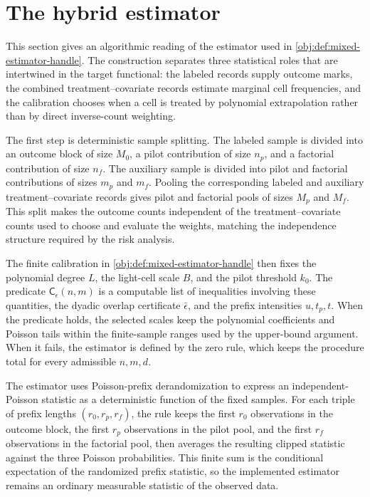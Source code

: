 \section{The hybrid estimator}\label{sec:hybrid-estimator}

This section gives an algorithmic reading of the estimator used in \cref{obj:def:mixed-estimator-handle}. The construction separates three statistical roles that are intertwined in the target functional: the labeled records supply outcome marks, the combined treatment--covariate records estimate marginal cell frequencies, and the calibration chooses when a cell is treated by polynomial extrapolation rather than by direct inverse-count weighting.

The first step is deterministic sample splitting. The labeled sample is divided into an outcome block of size \(M_0\), a pilot contribution of size \(n_p\), and a factorial contribution of size \(n_f\). The auxiliary sample is divided into pilot and factorial contributions of sizes \(m_p\) and \(m_f\). Pooling the corresponding labeled and auxiliary treatment--covariate records gives pilot and factorial pools of sizes \(M_p\) and \(M_f\). This split makes the outcome counts independent of the treatment--covariate counts used to choose and evaluate the weights, matching the independence structure required by the risk analysis.

The finite calibration in \cref{obj:def:mixed-estimator-handle} then fixes the polynomial degree \(L\), the light-cell scale \(B\), and the pilot threshold \(k_0\). The predicate \(\mathsf C_\epsilon(n,m)\) is a computable list of inequalities involving these quantities, the dyadic overlap certificate \(\bar\epsilon\), and the prefix intensities \(u,t_p,t\). When the predicate holds, the selected scales keep the polynomial coefficients and Poisson tails within the finite-sample ranges used by the upper-bound argument. When it fails, the estimator is defined by the zero rule, which keeps the procedure total for every admissible \(n,m,d\).

The estimator uses Poisson-prefix derandomization to express an independent-Poisson statistic as a deterministic function of the fixed samples. For each triple of prefix lengths \((r_0,r_p,r_f)\), the rule keeps the first \(r_0\) observations in the outcome block, the first \(r_p\) observations in the pilot pool, and the first \(r_f\) observations in the factorial pool, then averages the resulting clipped statistic against the three Poisson probabilities. This finite sum is the conditional expectation of the randomized prefix statistic, so the implemented estimator remains an ordinary measurable statistic of the observed data.

